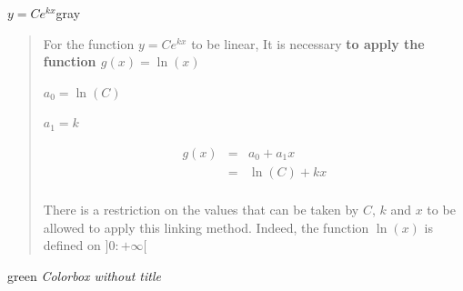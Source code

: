       \begin{colorbox}{{$y=Ce^{kx}$}}{gray}
            
        \begin{quote}
          For the function $y=Ce^{kx}$ to be linear, It is necessary \textbf{to apply the function \color{red}$g(x)=\ln(x)$}
          
          \vspace{0.5cm}

          $a_0=\ln(C)$

          $a_1=k$

          \begin{eqnarray*}
            g(x) &=& a_0 + a_1 x \\
                 &=& \ln(C) + kx \\
          \end{eqnarray*}

          \vspace{0.5cm}

          There is a restriction on the values that can be taken by $C$, $k$ and $x$ to be allowed to apply this linking method. Indeed, the function $\ln(x)$ is defined on $]0:+\infty[$

        \end{quote}
      \end{colorbox}

      \begin{colorbox}{}{green}
       \textit{Colorbox without title} 

       \vspace{0.5cm}

       \lipsum[10]
      \end{colorbox}

      \newpage

